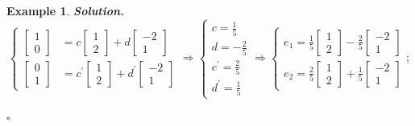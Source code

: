 \documentclass[12pt, a4paper]{article}
\newtheorem{eg}{Example}[subsection]
\newenvironment*{sol}{\indent\textbf{Solution. }}{\hfill{$\square$}\par}
\def\d{{\mathrm{d}}}
\begin{document}
\begin{eg}
\begin{sol}
$$\begin{cases}\begin{bmatrix}1\\0\end{bmatrix}&=c\begin{bmatrix}1\\2\end{bmatrix}+d\begin{bmatrix}-2\\1\end{bmatrix}\\\begin{bmatrix}0\\1\end{bmatrix}&=c^{'}\begin{bmatrix}1\\2\end{bmatrix}+d^{'}\begin{bmatrix}-2\\1\end{bmatrix}\end{cases}\Longrightarrow\begin{cases}c=\frac{1}{5}\\d=-\frac{2}{5}\\c^{'}=\frac{2}{5}\\d^{'}=\frac{1}{5}\end{cases}\Longrightarrow\begin{cases} e_1=\frac{1}{5}\begin{bmatrix}1\\2\end{bmatrix}-\frac{2}{5}\begin{bmatrix}-2\\1\end{bmatrix}\\e_2=\frac{2}{5}\begin{bmatrix}1\\2\end{bmatrix}+\frac{1}{5}\begin{bmatrix}-2\\1\end{bmatrix}\end{cases};$$

\end{sol}
\end{eg}
\end{document}
